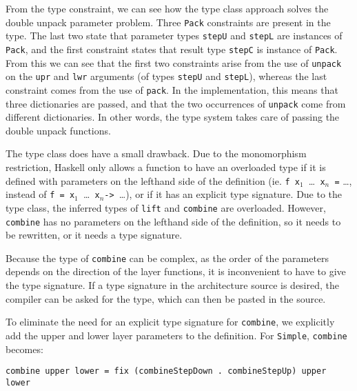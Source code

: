 \par From the type constraint, we can see how the type class approach
        solves the double unpack parameter problem. Three \texttt{Pack} constraints are
        present in the type. The last two state that parameter types \texttt{stepU} and
        \texttt{stepL} are instances of \texttt{Pack}, and the first constraint states
        that result type \texttt{stepC} is instance of \texttt{Pack}. From this we can
        see that the first two constraints arise from the use of \texttt{unpack} on the
        \texttt{upr} and \texttt{lwr} arguments (of types \texttt{stepU} and
        \texttt{stepL}), whereas the last constraint comes from the use of
        \texttt{pack}. In the implementation, this means that three dictionaries are
        passed, and that the two occurrences of \texttt{unpack} come from different
        dictionaries. In other words, the type system takes care of passing the double
        unpack functions.
\par The type class does have a small drawback. Due to the monomorphism
        restriction, Haskell only allows a function to have an overloaded type if it is
        defined with parameters on the lefthand side of the definition (ie. \texttt{f
        x$_1$~}\dots \texttt{~x$_n$ =} \dots, instead of \texttt{f =
        x$_1$~}\dots \texttt{~x$_n$}\verb|-> |\dots), or if it has an
        explicit type signature. Due to the type class, the inferred types of
        \texttt{lift} and \texttt{combine} are overloaded. However, \texttt{combine}
        has no parameters on the lefthand side of the definition, so it needs to be
        rewritten, or it needs a type signature.
\par Because the type of \texttt{combine} can be complex, as the order of
        the parameters depends on the direction of the layer functions, it is
        inconvenient to have to give the type signature. If a type signature in the
        architecture source is desired, the compiler can be asked for the type, which
        can then be pasted in the source.
\par To eliminate the need for an explicit type signature for
        \texttt{combine}, we explicitly add the upper and lower layer parameters to the
        definition. For \texttt{Simple}, \texttt{combine} becomes: \begin{small}\begin{verbatim}combine upper lower = fix (combineStepDown . combineStepUp) upper lower\end{verbatim}\end{small}


